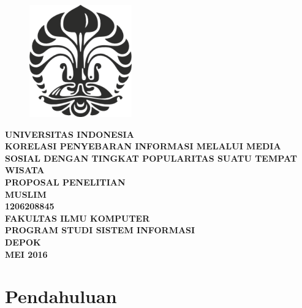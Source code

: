 \documentclass{article}
\makeatletter
\newcommand\tabfill[1]{%
\dimen@\linewidth%
\advance\dimen@\@totalleftmargin%
\advance\dimen@-\dimen\@curtab%
\parbox[t]\dimen@{\raggedright #1\ifhmode\strut\fi}%
}
\makeatother
\begin{document}
\begin{titlepage}
\begin{figure}
  \centering
  \includegraphics{logo_UI_hitam.png}
\end{figure}
\begin{center}
  \textbf{UNIVERSITAS INDONESIA}\\
  \vfill
  \textbf{KORELASI PENYEBARAN INFORMASI MELALUI MEDIA SOSIAL DENGAN TINGKAT POPULARITAS SUATU TEMPAT WISATA}\\
  \vfill
  \textbf{PROPOSAL PENELITIAN}\\
  \vfill
  \textbf{MUSLIM}\\
  \textbf{1206208845}\\
  \vfill
  \textbf{FAKULTAS ILMU KOMPUTER}\\
  \textbf{PROGRAM STUDI SISTEM INFORMASI}\\
  \textbf{DEPOK}\\
  \textbf{MEI 2016}
\end{center}
  \thispagestyle{empty}
\end{titlepage}


\renewcommand{\abstractname}{\textbf{ABSTRAK}}
\begin{abstract}
    \vspace{10pt}
    \vspace{10pt}
    \blindtext
\end{abstract}
\newpage


\section{Pendahuluan}
\end{document}
